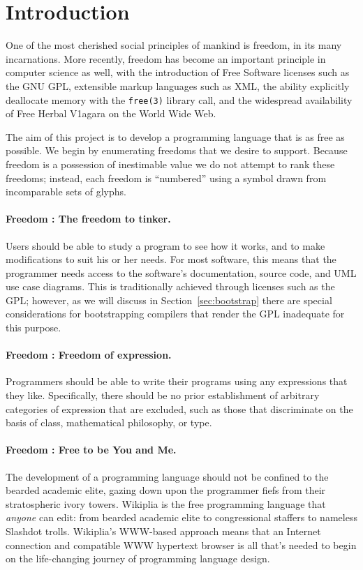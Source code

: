 \documentclass[twocolumn]{article}
\begin{document}
\section{Introduction}

One of the most cherished social principles of mankind is
freedom,\z{} in its many incarnations. More recently,
freedom has become an important principle in computer science as well,
with the introduction of Free Software licenses such as the GNU
GPL,\z{} extensible markup languages
such as XML,\z{} the ability explicitly deallocate memory
with the {\tt free(3)} library call, and the widespread availability of
Free Herbal V1agara on the World Wide Web.\z{}

The aim of this project is to develop a programming language that is
as free as possible. We begin by enumerating freedoms that we desire
to support. Because freedom is a possession of inestimable
value we do not attempt to rank these freedoms; instead,
each freedom is ``numbered'' using a symbol drawn from incomparable
sets of glyphs.

\paragraph{Freedom \ftinker: The freedom to tinker.}
Users should be able to study a program to see how it works, and to
make modifications to suit his or her needs. For most software, this
means that the programmer needs access to the software's
documentation, source code, and UML
use case diagrams. This is traditionally achieved through licenses
such as the GPL; however, as we will discuss in
Section~\ref{sec:bootstrap} there are special considerations for
bootstrapping compilers that render the GPL inadequate for this
purpose.

\paragraph{Freedom \fexpression: Freedom of expression.}
Programmers should be able to write their programs using any
expressions that they like. Specifically, there should be no
prior establishment of arbitrary categories of expression that
are excluded, such as those that discriminate on the basis
of class, mathematical philosophy, or type.

\paragraph{Freedom \ftobe: Free to be You and Me.}
The development of a programming language should not be confined to
the bearded academic elite, gazing down upon the programmer fiefs from
their stratospheric ivory towers. Wikiplia is the free programming
language that {\em anyone} can edit: from bearded academic
elite to congressional staffers to nameless Slashdot
trolls. Wikiplia's WWW-based approach means that an Internet
connection and compatible WWW hypertext browser is all that's needed
to begin on the life-changing journey of programming language design.
\end{document}
